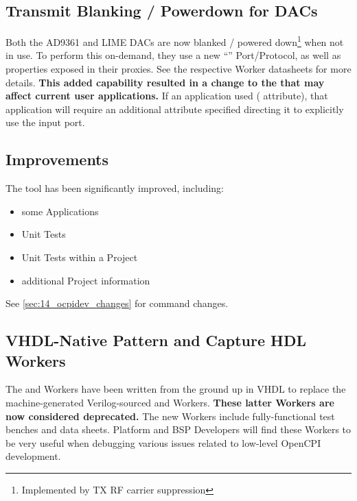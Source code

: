 \subsection{Transmit Blanking / Powerdown for DACs} %
\label{sec:14_blanking}
Both the AD9361 and LIME DACs are now blanked / powered down\footnote{Implemented by TX RF carrier suppression} when not in use. To perform this on-demand, they use a new ``'' Port/Protocol, as well as properties exposed in their proxies. See the respective Worker datasheets for more details. \textbf{This added capability resulted in a change to the  that may affect current user applications.} If an application used  ( attribute), that application will require an additional  attribute specified directing it to explicitly use the  input port.

\subsection{\ocpidev Improvements} %
\label{sec:14_ocpidev}
The \ocpidev tool has been significantly improved, including:
\begin{itemize}
\setlength\itemsep{0em} %
\item {} some Applications
\item {} Unit Tests
\item {} Unit Tests within a Project
\item {} additional Project information
\end{itemize}
See \ref{sec:14_ocpidev_changes} for \ocpidev command changes.

\subsection{VHDL-Native Pattern and Capture HDL Workers} %
\label{sec:14_pattern_capture}
The  and  Workers have been written from the ground up in VHDL to replace the machine-generated Verilog-sourced  and  Workers. \textbf{These latter Workers are now considered deprecated.} The new Workers include fully-functional test benches and data sheets. Platform and BSP Developers will find these Workers to be very useful when debugging various issues related to low-level OpenCPI development.

